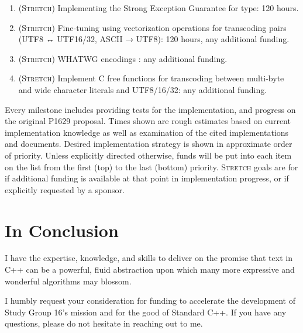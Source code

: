 \documentclass{wg21}
\begin{document}
\begin{enumerate}
	\item (\textsc{Stretch}) Implementing the Strong Exception Guarantee for  type: 120 hours.
	\item (\textsc{Stretch}) Fine-tuning using vectorization operations for transcoding pairs (UTF8 ↔ UTF16/32, ASCII → UTF8): 120 hours, any additional funding.
	\item (\textsc{Stretch}) WHATWG encodings \cite{whatwg_encoding}: any additional funding.
	\item (\textsc{Stretch}) Implement C free functions for transcoding between multi-byte and wide character literals and UTF8/16/32: any additional funding.
\end{enumerate}

Every milestone includes providing tests for the implementation, and progress on the original P1629 proposal. Times shown are rough estimates based on current implementation knowledge as well as examination of the cited implementations and documents. Desired implementation strategy is shown in approximate order of priority. Unless explicitly directed otherwise, funds will be put into each item on the list from the first (top) to the last (bottom) priority. \textsc{Stretch} goals are for if additional funding is available at that point in implementation progress, or if explicitly requested by a sponsor.


\section[conclusion]{In Conclusion}

I have the expertise, knowledge, and skills to deliver on the promise that text in C++ can be a powerful, fluid abstraction upon which many more expressive and wonderful algorithms may blossom.

I humbly request your consideration for funding to accelerate the development of Study Group 16's mission and for the good of Standard C++. If you have any questions, please do not hesitate in reaching out to me.



\end{document}
